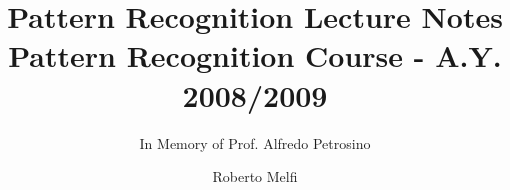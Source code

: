 \documentclass[envcountsame,envcountchap]{svmono}
\begin{document}
\author{Roberto Melfi}
\title{Pattern Recognition Lecture Notes\\
{\small Pattern Recognition Course - A.Y. 2008/2009}}
\subtitle{In Memory of Prof. Alfredo Petrosino}
\maketitle

\frontmatter%




\tableofcontents


\mainmatter%







%





\backmatter%
%

\printindex

\end{document}
